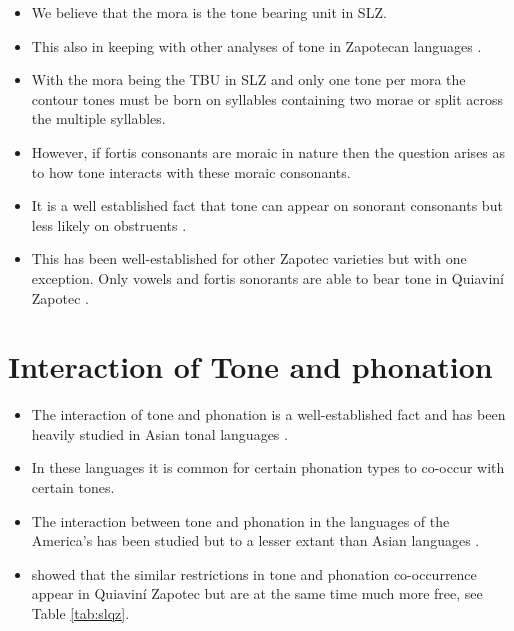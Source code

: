 \documentclass[12pt, letterpaper]{article}
\begin{document}
\begin{itemize}
	\item We believe that the mora is the tone bearing unit in SLZ. 
	\item This also in keeping with other analyses of tone in Zapotecan languages \citep[e.g.,][]{chavez-peonInteractionMetricalStructure2010}.
	\item With the mora being the TBU in SLZ and only one tone per mora the contour tones must be born on syllables containing two morae or split across the multiple syllables. 
	\item However, if fortis consonants are moraic in nature then the question arises as to how tone interacts with these moraic consonants. 
	\item It is a well established fact that tone can appear on sonorant consonants but less likely on obstruents \citep[e.g.,][]{yipTone2002,hymanHowStudyTone2014,sniderEstablishingUnderlyingTonal2014,sniderToneAnalysisField2018}. 
	\item This has been well-established for other Zapotec varieties but with one exception. Only vowels and fortis sonorants are able to bear tone in Quiaviní Zapotec \citep[Ch. 5]{chavez-peonInteractionMetricalStructure2010}. 
\end{itemize}

\section{Interaction of Tone and phonation} \label{sec:Interaction}

\begin{itemize}
	\item The interaction of tone and phonation is a well-established fact and has been heavily studied in Asian tonal languages \citep[see references in][]{yipTone2002,michaudComplexTonesEast2012,brunelleTonePhonationSoutheast2016}.
	\item In these languages it is common for certain phonation types to co-occur with certain tones.
	\item The interaction between tone and phonation in the languages of the America's has been studied but to a lesser extant than Asian languages \citep{adlerAcousticsPhonationTypes2016,chavez-peonInteractionMetricalStructure2010,dicanioCoarticulationToneGlottal2012}. 
	\item \citet{chavez-peonInteractionMetricalStructure2010} showed that the similar restrictions in tone and phonation co-occurrence appear in Quiaviní Zapotec but are at the same time much more free, see Table \ref{tab:slqz}.
\end{itemize}
\end{document}
